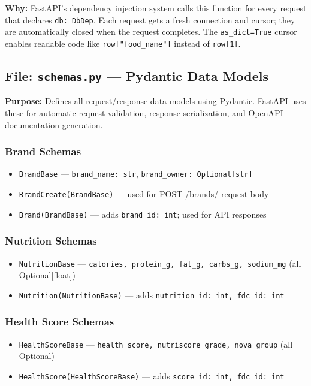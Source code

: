 \documentclass[12pt,a4paper]{article}
\begin{document}
\textbf{Why:} FastAPI's dependency injection system calls this function for every request that declares \texttt{db: DbDep}. Each request gets a fresh connection and cursor; they are automatically closed when the request completes. The \texttt{as\_dict=True} cursor enables readable code like \texttt{row["food\_name"]} instead of \texttt{row[1]}.

\subsection{File: \texttt{schemas.py} — Pydantic Data Models}

\textbf{Purpose:} Defines all request/response data models using Pydantic. FastAPI uses these for automatic request validation, response serialization, and OpenAPI documentation generation.

\subsubsection{Brand Schemas}
\begin{itemize}[nosep]
    \item \texttt{BrandBase} — \texttt{brand\_name: str}, \texttt{brand\_owner: Optional[str]}
    \item \texttt{BrandCreate(BrandBase)} — used for POST /brands/ request body
    \item \texttt{Brand(BrandBase)} — adds \texttt{brand\_id: int}; used for API responses
\end{itemize}

\subsubsection{Nutrition Schemas}
\begin{itemize}[nosep]
    \item \texttt{NutritionBase} — \texttt{calories, protein\_g, fat\_g, carbs\_g, sodium\_mg} (all Optional[float])
    \item \texttt{Nutrition(NutritionBase)} — adds \texttt{nutrition\_id: int, fdc\_id: int}
\end{itemize}

\subsubsection{Health Score Schemas}
\begin{itemize}[nosep]
    \item \texttt{HealthScoreBase} — \texttt{health\_score, nutriscore\_grade, nova\_group} (all Optional)
    \item \texttt{HealthScore(HealthScoreBase)} — adds \texttt{score\_id: int, fdc\_id: int}
\end{itemize}
\end{document}
